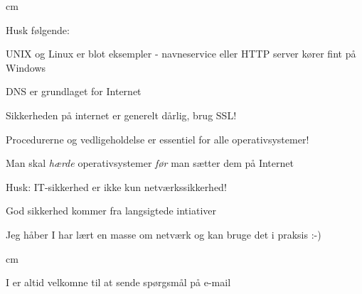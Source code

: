 \documentclass[Screen16to9,17pt]{foils}
\begin{document}
\slide{}


\begin{quote}

\end{quote}

\begin{list2}
    \item
\end{list2}




 cm

\begin{list1}
\item Husk følgende:
\begin{list2}
\item UNIX og Linux er blot eksempler - navneservice eller HTTP
  server kører fint på Windows
\item DNS er grundlaget for Internet
\item Sikkerheden på internet er generelt dårlig, brug SSL!
\item Procedurerne og vedligeholdelse er essentiel for alle
  operativsystemer!
\item Man skal \emph{hærde} operativsystemer \emph{før} man sætter dem på
  Internet
\item Husk: IT-sikkerhed er ikke kun netværkssikkerhed!
\item God sikkerhed kommer fra langsigtede intiativer\\
\end{list2}
\item Jeg håber I har lært en masse om netværk og kan bruge det i praksis :-)
\end{list1}



\vskip 4cm

\begin{center}
\hlkbig

\myname

\myweb
{} cm

I er altid velkomne til at sende spørgsmål på e-mail
\end{center}
\end{document}
